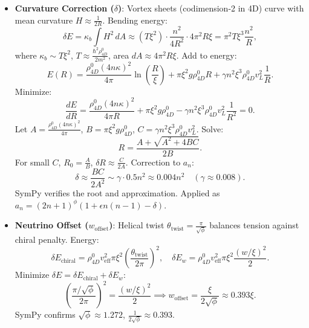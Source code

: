 \begin{itemize}
\item \textbf{Curvature Correction (\(\delta\))}: Vortex sheets (codimension-2 in 4D) curve with mean curvature \(H \approx \frac{1}{2R}\). Bending energy:
  \[
  \delta E = \kappa_b \int H^2 \, dA \approx \left(T \xi^2\right) \cdot \frac{n^2}{4 R^2} \cdot 4\pi^2 R \xi = \pi^2 T \xi^3 \frac{n^2}{R},
  \]
  where \(\kappa_b \sim T \xi^2\), \(T \approx \frac{\hbar^2 \rho_{4D}^0}{2 m^2}\), area \(dA \approx 4\pi^2 R \xi\). Add to energy:
  \[
  E(R) = \frac{\rho_{4D}^0 (4 n \kappa)^2}{4\pi} \ln\left(\frac{R}{\xi}\right) + \pi \xi^2 g \rho_{4D}^0 R + \gamma n^2 \xi^3 \rho_{4D}^0 v_L^2 \frac{1}{R}.
  \]
  Minimize:
  \[
  \frac{dE}{dR} = \frac{\rho_{4D}^0 (4 n \kappa)^2}{4\pi R} + \pi \xi^2 g \rho_{4D}^0 - \gamma n^2 \xi^3 \rho_{4D}^0 v_L^2 \frac{1}{R^2} = 0.
  \]
  Let \(A = \frac{\rho_{4D}^0 (4 n \kappa)^2}{4\pi}\), \(B = \pi \xi^2 g \rho_{4D}^0\), \(C = \gamma n^2 \xi^3 \rho_{4D}^0 v_L^2\). Solve:
  \[
  R = \frac{A + \sqrt{A^2 + 4 B C}}{2 B}.
  \]
  For small \(C\), \(R_0 = \frac{A}{B}\), \(\delta R \approx \frac{C}{2 A}\). Correction to \(a_n\):
  \[
  \delta \approx \frac{B C}{2 A^2} \sim \gamma \cdot 0.5 n^2 \approx 0.004 n^2 \quad (\gamma \approx 0.008).
  \]
  SymPy verifies the root and approximation. Applied as \(a_n = (2n+1)^\phi (1 + \epsilon n(n-1) - \delta)\).

\item \textbf{Neutrino Offset (\(w_{\text{offset}}\))}: Helical twist \(\theta_{\text{twist}} = \frac{\pi}{\sqrt{\phi}}\) balances tension against chiral penalty. Energy:
  \[
  \delta E_{\text{chiral}} = \rho_{4D}^0 v_{\text{eff}}^2 \pi \xi^2 \left( \frac{\theta_{\text{twist}}}{2\pi} \right)^2, \quad \delta E_w = \rho_{4D}^0 v_{\text{eff}}^2 \pi \xi^2 \frac{(w / \xi)^2}{2}.
  \]
  Minimize \(\delta E = \delta E_{\text{chiral}} + \delta E_w\):
  \[
  \left( \frac{\pi / \sqrt{\phi}}{2\pi} \right)^2 = \frac{(w / \xi)^2}{2} \implies w_{\text{offset}} = \frac{\xi}{2 \sqrt{\phi}} \approx 0.393 \xi.
  \]
  SymPy confirms \(\sqrt{\phi} \approx 1.272\), \(\frac{1}{2 \sqrt{\phi}} \approx 0.393\).
\end{itemize}


